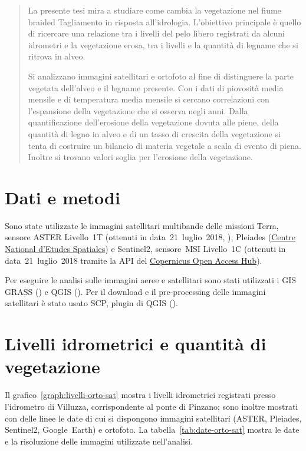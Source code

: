 \documentclass[12pt,a4paper]{article}
\begin{document}


\begin{abstract}
La presente tesi mira a studiare come cambia la vegetazione nel fiume braided Tagliamento in risposta all'idrologia. 
L'obiettivo principale è quello di ricercare una relazione tra i livelli del pelo libero registrati da alcuni idrometri e la vegetazione erosa, tra i livelli e la quantità di legname che si ritrova in alveo.

Si analizzano immagini satellitari e ortofoto al fine di distinguere la parte vegetata dell'alveo e il legname presente.
Con i dati di piovosità media mensile e di temperatura media mensile si cercano correlazioni con l'espansione della vegetazione che si osserva negli anni.
Dalla quantificazione dell'erosione della vegetazione dovuta alle piene, della quantità di legno in alveo e di un tasso di crescita della vegetazione si tenta di costruire un bilancio di materia vegetale a scala di evento di piena.
Inoltre si trovano valori soglia per l'erosione della vegetazione.
\end{abstract}

\clearpage


\section{Dati e metodi}
Sono state utilizzate le immagini satellitari multibande delle missioni Terra, sensore ASTER Livello~1T (ottenuti in data~21~luglio~2018, \cite{data:ASTER}), 
Pleiades (\href{https://pleiades.cnes.fr/en/PLEIADES/index.htm}{Centre National d'Etudes Spatiales}) 
e Sentinel2, sensore~MSI Livello~1C (ottenuti in data~21~luglio~2018 tramite la API del \href{http://scihub.copernicus.eu/}{Copernicus Open Access Hub}).


Per eseguire le analisi sulle immagini aeree e satellitari sono stati utilizzati i GIS GRASS (\cite{soft:GRASS}) e QGIS (\cite{soft:QGIS}). Per il download e il pre-processing delle immagini satellitari è stato usato SCP, plugin di QGIS (\cite{soft:SCP}).


\section{Livelli idrometrici e quantità di vegetazione}
Il grafico~\ref{graph:livelli-orto-sat} mostra i livelli idrometrici registrati presso l'idrometro di Villuzza, corrispondente al ponte di Pinzano; sono inoltre mostrati con delle linee le date di cui si dispongono immagini satellitari (ASTER, Pleiades, Sentinel2, Google~Earth) e ortofoto.
La tabella~\ref{tab:date-orto-sat} mostra le date e la risoluzione delle immagini utilizzate nell'analisi.
\end{document}
